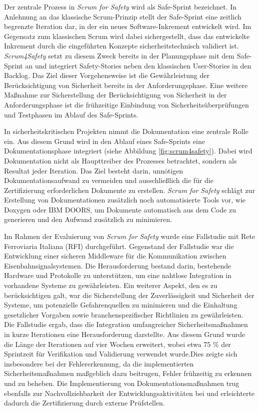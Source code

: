 \documentclass[acmtog]{acmart}
\begin{document}
Der zentrale Prozess in \textit{Scrum for Safety} wird als Safe-Sprint bezeichnet. In Anlehnung an das klassische Scrum-Prinzip stellt der Safe-Sprint eine zeitlich begrenzte Iteration dar, in der ein neues Software-Inkrement entwickelt wird. 
Im Gegensatz zum klassischen Scrum wird dabei sichergestellt, dass das entwickelte Inkrement durch die eingeführten Konzepte sicherheitstechnisch validiert ist. \cite{barbareschi_scrum_2022}
\textit{Scrum4Safety} setzt zu diesem Zweck bereits in der Planungsphase mit dem Safe-Sprint an und integriert Safety-Stories neben den klassischen User-Stories in den Backlog.
Das Ziel dieser Vorgehensweise ist die Gewährleistung der Berücksichtigung von Sicherheit bereits in der Anforderungsphase. 
Eine weitere Maßnahme zur Sicherstellung der Berücksichtigung von Sicherheit in der Anforderungsphase ist die frühzeitige Einbindung von Sicherheitsüberprüfungen und Testphasen im Ablauf des Safe-Sprints. \cite{barbareschi_scrum_2022}

In sicherheitskritischen Projekten nimmt die Dokumentation eine zentrale Rolle ein. Aus diesem Grund wird in den Ablauf eines Safe-Sprints eine Dokumentationsphase integriert (siehe Abbildung \ref{fig:scrum4safety}). 
Dabei wird Dokumentation nicht als Haupttreiber des Prozesses betrachtet, sondern als Resultat jeder Iteration. \cite{barbareschi_scrum_2022}
Das Ziel besteht darin, unnötigen Dokumentationsaufwand zu vermeiden und ausschließlich die für die Zertifizierung erforderlichen Dokumente zu erstellen. 
\textit{Scrum for Safety} schlägt zur Erstellung von Dokumentationen zusätzlich noch automatisierte Tools vor, wie Doxygen oder IBM DOORS, um Dokumente automatisch aus dem Code zu generieren und den Aufwand zusätzlich zu minimieren. \cite{barbareschi_scrum_2022}

Im Rahmen der Evaluierung von \textit{Scrum for Safety} wurde eine Fallstudie mit Rete Ferroviaria Italiana (RFI) durchgeführt. Gegenstand der Fallstudie war die Entwicklung einer sicheren Middleware für die Kommunikation zwischen Eisenbahnsignalsystemen. 
Die Herausforderung bestand darin, bestehende Hardware und Protokolle zu unterstützen, um eine nahtlose Integration in vorhandene Systeme zu gewährleisten. Ein weiterer Aspekt, den es zu berücksichtigen galt, 
war die Sicherstellung der Zuverlässigkeit und Sicherheit der Systeme, um potenzielle Gefahrenquellen zu minimieren und die Einhaltung gesetzlicher Vorgaben sowie branchenspezifischer Richtlinien zu gewährleisten. Die Fallstudie ergab, 
dass die Integration umfangreicher Sicherheitsmaßnahmen in kurze Iterationen eine Herausforderung darstellte. \cite{barbareschi_scrum_2022}
Aus diesem Grund wurde die Länge der Iterationen auf vier Wochen erweitert, wobei etwa 75 \% der Sprintzeit für Verifikation und Validierung verwendet wurde.Dies zeigte sich insbesondere bei der Fehlererkennung, 
da die implementierten Sicherheitsmaßnahmen maßgeblich dazu beitrugen, Fehler frühzeitig zu erkennen und zu beheben. 
Die Implementierung von Dokumentationsmaßnahmen trug ebenfalls zur Nachvollziehbarkeit der Entwicklungsaktivitäten bei und erleichterte dadurch die Zertifizierung durch externe Prüfstellen. \cite{barbareschi_scrum_2022}
\end{document}
